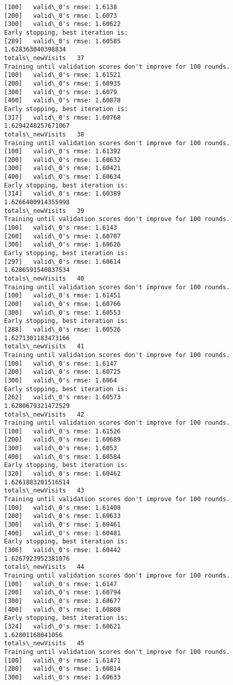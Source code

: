 \documentclass[11pt]{article}
\begin{document}
\begin{Verbatim}[commandchars=\\\{\}]
[100]	valid\_0's rmse: 1.6138
[200]	valid\_0's rmse: 1.6073
[300]	valid\_0's rmse: 1.60622
Early stopping, best iteration is:
[289]	valid\_0's rmse: 1.60585
1.628363040398834
totals\_newVisits   37
Training until validation scores don't improve for 100 rounds.
[100]	valid\_0's rmse: 1.61521
[200]	valid\_0's rmse: 1.60935
[300]	valid\_0's rmse: 1.6079
[400]	valid\_0's rmse: 1.60878
Early stopping, best iteration is:
[317]	valid\_0's rmse: 1.60768
1.6294248257671067
totals\_newVisits   38
Training until validation scores don't improve for 100 rounds.
[100]	valid\_0's rmse: 1.61392
[200]	valid\_0's rmse: 1.60632
[300]	valid\_0's rmse: 1.60421
[400]	valid\_0's rmse: 1.60634
Early stopping, best iteration is:
[314]	valid\_0's rmse: 1.60389
1.6266400914355998
totals\_newVisits   39
Training until validation scores don't improve for 100 rounds.
[100]	valid\_0's rmse: 1.6143
[200]	valid\_0's rmse: 1.60707
[300]	valid\_0's rmse: 1.60626
Early stopping, best iteration is:
[297]	valid\_0's rmse: 1.60614
1.6286591540837534
totals\_newVisits   40
Training until validation scores don't improve for 100 rounds.
[100]	valid\_0's rmse: 1.61451
[200]	valid\_0's rmse: 1.60766
[300]	valid\_0's rmse: 1.60553
Early stopping, best iteration is:
[288]	valid\_0's rmse: 1.60526
1.6271301183473166
totals\_newVisits   41
Training until validation scores don't improve for 100 rounds.
[100]	valid\_0's rmse: 1.6147
[200]	valid\_0's rmse: 1.60725
[300]	valid\_0's rmse: 1.6064
Early stopping, best iteration is:
[262]	valid\_0's rmse: 1.60573
1.6280679321472529
totals\_newVisits   42
Training until validation scores don't improve for 100 rounds.
[100]	valid\_0's rmse: 1.61526
[200]	valid\_0's rmse: 1.60689
[300]	valid\_0's rmse: 1.6053
[400]	valid\_0's rmse: 1.60584
Early stopping, best iteration is:
[320]	valid\_0's rmse: 1.60462
1.6261883201516514
totals\_newVisits   43
Training until validation scores don't improve for 100 rounds.
[100]	valid\_0's rmse: 1.61408
[200]	valid\_0's rmse: 1.60633
[300]	valid\_0's rmse: 1.60461
[400]	valid\_0's rmse: 1.60481
Early stopping, best iteration is:
[306]	valid\_0's rmse: 1.60442
1.6267923952381076
totals\_newVisits   44
Training until validation scores don't improve for 100 rounds.
[100]	valid\_0's rmse: 1.6147
[200]	valid\_0's rmse: 1.60794
[300]	valid\_0's rmse: 1.60677
[400]	valid\_0's rmse: 1.60808
Early stopping, best iteration is:
[324]	valid\_0's rmse: 1.60621
1.62801168041056
totals\_newVisits   45
Training until validation scores don't improve for 100 rounds.
[100]	valid\_0's rmse: 1.61471
[200]	valid\_0's rmse: 1.60814
[300]	valid\_0's rmse: 1.60633

\end{Verbatim}
\end{document}
